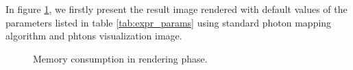 In figure \ref{fig:pm_global}, we firstly present the result image rendered with default values of the parameters listed in table \ref{tab:expr_params} using standard photon mapping algorithm and phtons visualization image. 

\begin{figure}[htp] 
\begin{center}
    \renewcommand{\thefigure}{\thechapter.\arabic{figure}}
    \caption[]{Memory consumption in rendering phase.}
    \label{fig:pm_global} 
\end{center} 
\end{figure}   

